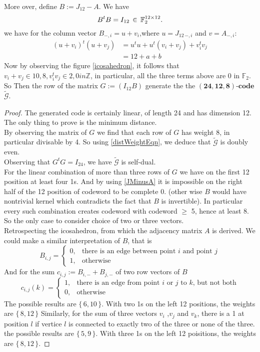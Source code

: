\documentclass{article}
\numberwithin{equation}{theorem}
\numberwithin{figure}{theorem}
\newcommand{\Ftwo}{\ensuremath{\mathbb{F}_2}}
\newcommand{\cCodes}{\ensuremath{\widetilde{\mathscr{G}}}}
\newcommand{\linearCode}[3]{\ensuremath{\bm{(#1,#2,#3)\mbox{-}code}}}
\newcommand{\myMatrixRing}[2]{\ensuremath{#1^{#2\times#2}}}
\newcommand{\Integer}{\ensuremath{\mathbb{Z}}}
\begin{document}
More over, define $B := J_{12} - A$. We have 
\begin{equation}\label{JMinusA}
	B^tB = I_{12} \,\in \,{\myMatrixRing{\Ftwo}{12}}.\\
\end{equation}
we have for the column vector $B_{-,i} = u + v_i$,where $u = J_{12\,-,i}$ and $v = A_{-,i}$:
\begin{align*}
	(u + v_i)^t(u + v_j) &= u^tu + u^t(v_i + v_j) + v_i^tv_j\\
						 &= 12 + a + b
\end{align*}
Now by observing the figure \ref{icosahedron}, it follows that
$v_i + v_j \in {10,8}, v_i^tv_j \in {2,0} in \Integer$, in particular, all the three terms above are 0 in $\Ftwo$. So 
Then the row of the matrix $G := (I_{12} B)$ generate the the {\linearCode{24}{12}{8}} \cCodes.
\begin{proof}
The generated code is certainly linear, of length 24 and has dimension 12. The only thing to prove is the minimum distance.\\
By observing the matrix of $G$ we find that each row of $G$ has weight 8, in particular divisable by 4. So using \ref{distWeightEqn}, we deduce that {\cCodes} is doubly even.\\
Observing that $G^tG = I_{24}$, we have {\cCodes} is self-dual.\\
For the linear combination of more than three rows of $G$ we have on the first 12 position at least four 1s. And by using \ref{JMinusA} it is impossible on the right half of the 12 position of codeword to be complete 0. (other wise $B$ would have nontrivial kernel which contradicts the fact that $B$ is invertible). In particular every such combination creates codeword with codeword $\geq$ 5, hence at least 8. So the only case to consider choice of two or three vectors. \\
Retrospecting the icosahedron, from which the adjacency matrix $A$ is derived.  We could make a similar interpretation of $B$, that is 
\[
	B_{i,j} = 
	\begin{cases}
		0, &\text{there is an edge between point $i$ and point $j$}\\
		1, &\text{otherwise}
	\end{cases}
\]
And for the sum $c_{i,j} := B_{i,-} + B_{j,-} $ of two row vectors of $B$
\[
	c_{i,j}(k) = 
	\begin{cases}
		1, &\text{there is an edge from point $i$ or $j$ to $k$, but not both}\\
		0, &\text{otherwise}
	\end{cases}
\]
The possible results are $\{\,6,10\,\}$. With two 1s on the left 12 positions,  the weights are $\{\,8,12\,\}$
Similarly, for the sum of three vectors $v_i$ ,$v_j$ and $v_k$, there is a 1 at position $l$ if vertice $l$ is connected to exactly two of the three or none of the three.
  the possible results are $\{\,5,9\,\}$. With three 1s on the left 12 poisitions, the weights are $\{\,8,12\,\}$. 
\end{proof}
\end{document}
